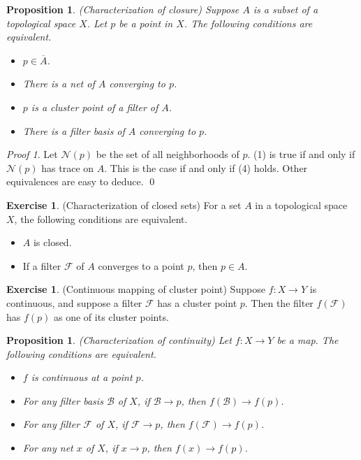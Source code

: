 \documentclass[a4paper,12pt]{article}
\newtheorem{prp}[thm]{Proposition}
\theoremstyle{remark}
\newtheorem*{prf}{Proof}
\theoremstyle{definition}
\theoremstyle{definition}
\theoremstyle{definition}
\newtheorem{exe}[thm]{Exercise}
\begin{document}
\begin{prp}\label{characterize closure} (Characterization of closure)
	Suppose \( A \) is a subset of a topological space \( X \). Let \( p \) be a point in \( X \). The following conditions are equivalent.
	\begin{itemize}
		\item[(1)] \( p \in \overline{A} \).
		\item[(2)] There is a net of \( A \) converging to \( p \).
		\item[(3)] \( p \) is a cluster point of a filter of \( A \).
		\item[(4)] There is a filter basis of \( A \) converging to \( p \).
	\end{itemize}
\end{prp}
\begin{prf}
	Let \( \mathscr{N}(p) \) be the set of all neighborhoods of \( p \).
	(1) is true if and only if \( \mathscr{N}(p) \) has trace on \( A \). This is the case if and only if (4) holds. Other equivalences are easy to deduce.
	\qed\end{prf}

\begin{exe}\label{characterize closed} (Characterization of closed sets)
	For a set \( A \) in a topological space \( X \), the following conditions are equivalent.
	\begin{itemize}
		\item[(1)] \( A \) is closed.
		\item[(2)] If a filter \( \mathscr{F} \) of \( A \) converges to a point \( p \), then \( p \in A \).
	\end{itemize}
\end{exe}

\begin{exe}\label{continous mapping of cp} (Continuous mapping of cluster point)
	Suppose \( f:X \to Y \) is continuous, and suppose a filter \( \mathscr{F} \) has a cluster point \( p \). Then the filter \( f(\mathscr{F}) \) has \( f(p) \) as one of its cluster points.
\end{exe}

\begin{prp}\label{characterize continuity} (Characterization of continuity)
	Let \( f:X \to Y \) be a map. The following conditions are equivalent.
	\begin{itemize}
		\item[(1)] \( f \) is continuous at a point \( p \).
		\item[(2)] For any filter basis \( \mathscr{B} \) of \( X \), if \( \mathscr{B} \to p \), then \( f(\mathscr{B}) \to f(p) \).
		\item[(3)] For any filter \( \mathscr{F} \) of \( X \), if \( \mathscr{F} \to p \), then \( f(\mathscr{F})\to f(p) \).
		\item[(4)] For any net \( x \) of \( X \), if \( x \to p \), then \( f(x)\to f(p) \).
	\end{itemize}
\end{prp}
\end{document}

